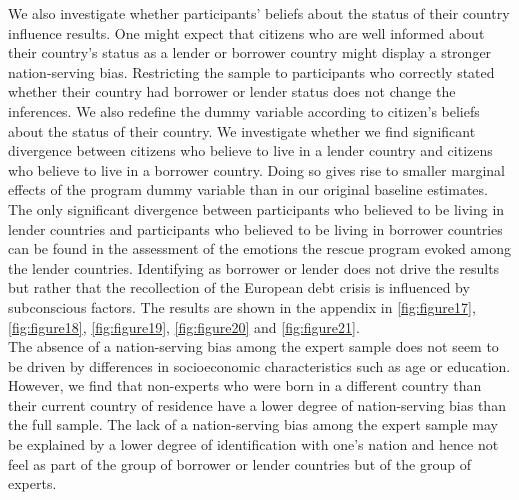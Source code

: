 We also investigate whether participants' beliefs about the status of their country influence results. One might expect that citizens who are well informed about their country's status as a lender or borrower country might display a stronger nation-serving bias. Restricting the sample to participants who correctly stated whether their country had borrower or lender status does not change the inferences. We also redefine the dummy variable according to citizen's beliefs about the status of their country. We investigate whether we find significant divergence between citizens who believe to live in a lender country and citizens who believe to live in a borrower country. Doing so gives rise to smaller marginal effects of the program dummy variable than in our original baseline estimates. The only significant divergence between participants who believed to be living in lender countries and participants who believed to be living in borrower countries can be found in the assessment of the emotions the rescue program evoked among the lender countries. Identifying as borrower or lender does not drive the results but rather that the recollection of the European debt crisis is influenced by subconscious factors. The results are shown in the appendix in \autoref{fig:figure17}, \autoref{fig:figure18}, \autoref{fig:figure19}, \autoref{fig:figure20} and \autoref{fig:figure21}. 
\\
The absence of a nation-serving bias among the expert sample does not seem to be driven by differences in socioeconomic characteristics such as age or education.  However, we find that non-experts who were born in a different country than their current country of residence have a lower degree of nation-serving bias than the full sample. The lack of  a nation-serving bias among the expert sample may be explained by a lower degree of identification with one's nation and hence not feel as part of the group of borrower or lender countries but of the group of experts. 

